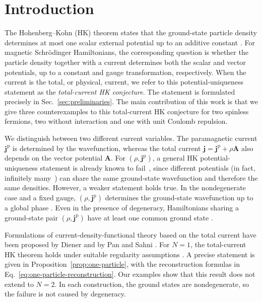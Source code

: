 \documentclass[11pt,a4paper]{article}
\theoremstyle{remark}
\theoremstyle{plain}
\newcommand{\jp}{\mathbf j^{\mathrm p}}
\newcommand{\jj}{\mathbf j}
\newcommand{\A}{\mathbf A}
\begin{document}
\section{Introduction}
\label{sec:introduction}

The Hohenberg--Kohn (HK) theorem states that the ground-state particle
density determines at most one scalar external potential up to an additive
constant \cite{HK1964}. For magnetic Schr\"odinger Hamiltonians,
the corresponding question is whether the particle density together
with a current determines both the scalar and vector potentials, up
to a constant and gauge transformation, respectively. 
When the current is the
total, or physical, current, we refer to this potential-uniqueness
statement as the \emph{total-current HK conjecture}. The statement is formulated
precisely in Sec.~\ref{sec:preliminaries}. The main contribution
of this work is that we give three counterexamples
to this total-current HK conjecture for two spinless fermions,
two without interaction and one with unit 
Coulomb repulsion.

We distinguish between two different current variables. 
The paramagnetic current $\jp$ is determined by the wavefunction,
whereas the total current $\jj=\jp+\rho\A$ also depends on the vector
potential $\A$. For $(\rho,\jp)$, a general HK potential-uniqueness
statement is already known to fail~\cite{CV2002}, 
since different potentials (in fact, infinitely many~\cite{LB2014}) can share the
same ground-state wavefunction and therefore the same densities. 
However, a weaker statement holds true. In the nondegenerate
case and a fixed gauge, $(\rho,\jp)$ determines the ground-state
wavefunction up to a global phase \cite{VR1987,LB2014}.
Even in the presence of degeneracy, Hamiltonians sharing a ground-state pair
$(\rho,\jp)$ have at least one common ground state \cite{LT2018}.


Formulations of current-density-functional theory based on the
total current have been proposed by Diener
\cite{Diener1991} and by Pan and Sahni \cite{PS2010}. 
For $N=1$, the total-current HK theorem holds under suitable
regularity assumptions \cite{Tellgren2012,LB2014}. 
A precise statement is given in Proposition~\ref{prop:one-particle},
with the reconstruction formulas in Eq.~\eqref{eq:one-particle-reconstruction}.
Our examples show that this result does not extend to $N=2$. In each construction,
the ground states are nondegenerate, so the failure is not caused by
degeneracy.
\end{document}
